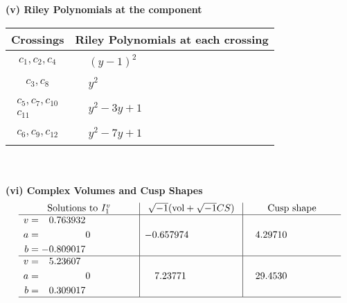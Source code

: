 \documentclass[1p]{elsarticle_modified}
\theoremstyle{definition}
\newcommand{\I}{\sqrt{-1}}
\begin{document}
\newpage\renewcommand{\arraystretch}{1}
\flushleft \textbf{(v) Riley Polynomials at the component}\newline \\
\begin{tabular}{m{50pt}|m{274pt}}
Crossings & \hspace{64pt}Riley Polynomials at each crossing \\
\hline $$\begin{aligned}c_{1},c_{2},c_{4}\end{aligned}$$&$\begin{aligned}
&(y-1)^2
\end{aligned}$\\
\hline $$\begin{aligned}c_{3},c_{8}\end{aligned}$$&$\begin{aligned}
&y^2
\end{aligned}$\\
\hline $$\begin{aligned}c_{5},c_{7},c_{10}\\c_{11}\end{aligned}$$&$\begin{aligned}
&y^2-3 y+1
\end{aligned}$\\
\hline $$\begin{aligned}c_{6},c_{9},c_{12}\end{aligned}$$&$\begin{aligned}
&y^2-7 y+1
\end{aligned}$\\
\hline
\end{tabular}\\~\\
\newpage\flushleft \textbf{(vi) Complex Volumes and Cusp Shapes}
$$\begin{array}{c|c|c}  
\text{Solutions to }I^v_{1}& \I (\text{vol} + \sqrt{-1}CS) & \text{Cusp shape}\\
 \hline 
\begin{aligned}
v &= \phantom{-}0.763932\phantom{ +0.000000I} \\
a &= \phantom{-0.000000 } 0 \\
b &= -0.809017\phantom{ +0.000000I}\end{aligned}
 & -0.657974\phantom{ +0.000000I} & \phantom{-}4.29710\phantom{ +0.000000I} \\ \hline\begin{aligned}
v &= \phantom{-}5.23607\phantom{ +0.000000I} \\
a &= \phantom{-0.000000 } 0 \\
b &= \phantom{-}0.309017\phantom{ +0.000000I}\end{aligned}
 & \phantom{-}7.23771\phantom{ +0.000000I} & \phantom{-}29.4530\phantom{ +0.000000I}\\
 \hline 
 \end{array}$$\newpage
\end{document}
